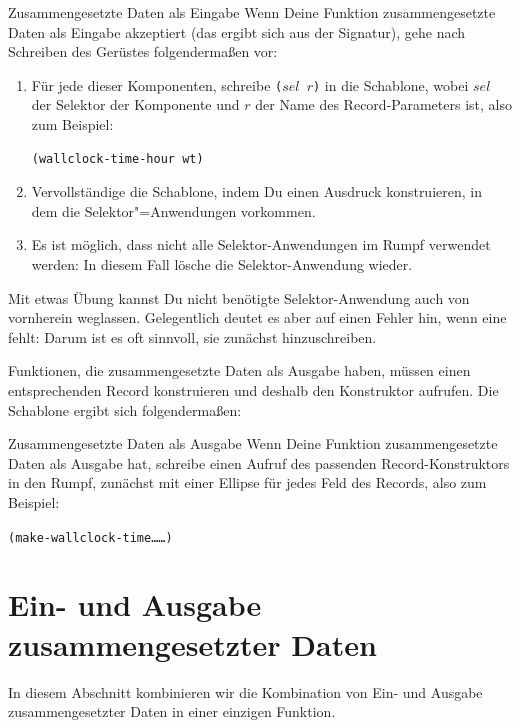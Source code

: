 \begin{konstruktionsanleitung}{Zusammengesetzte Daten als Eingabe}
  Wenn Deine Funktion zusammengesetzte Daten als Eingabe akzeptiert
  (das ergibt sich aus der Signatur), gehe nach Schreiben des Gerüstes
  folgendermaßen vor:
%
\begin{enumerate}
\item Für jede dieser Komponenten, schreibe  \texttt{($\mathit{sel}$ $r$)} in die
  Schablone, wobei $\mathit{sel}$ der Selektor der Komponente und $r$ der Name
  des Record-Parameters ist, also zum Beispiel:
\begin{verbatim}
(wallclock-time-hour wt)
\end{verbatim}
\item Vervollständige die Schablone, indem Du einen Ausdruck
  konstruieren, in dem die Selektor"=Anwendungen vorkommen.
\item Es ist möglich, dass nicht alle Selektor-Anwendungen im Rumpf
  verwendet werden: In diesem Fall lösche die Selektor-Anwendung
  wieder.
\end{enumerate}
%
\end{konstruktionsanleitung}
%
Mit etwas Übung kannst Du nicht benötigte Selektor-Anwendung auch von
vornherein weglassen.  Gelegentlich deutet es aber auf einen Fehler
hin, wenn eine fehlt: Darum ist es oft sinnvoll, sie zunächst
hinzuschreiben.

Funktionen, die zusammengesetzte Daten als Ausgabe haben, müssen einen
entsprechenden Record konstruieren und deshalb den Konstruktor
aufrufen.  Die Schablone ergibt sich folgendermaßen:
%
\begin{konstruktionsanleitung}{Zusammengesetzte Daten als Ausgabe}
  Wenn Deine Funktion zusammengesetzte Daten als Ausgabe hat, schreibe
  einen Aufruf des passenden Record-Konstruktors in den Rumpf,
  zunächst mit einer Ellipse für jedes Feld des Records, also zum
  Beispiel:
\begin{alltt}
(make-wallclock-time \ldots{} \ldots)
\end{alltt}

\end{konstruktionsanleitung}

\section{Ein- und Ausgabe zusammengesetzter Daten}
\label{sec:armadillo}

In diesem Abschnitt kombinieren wir die Kombination von Ein- und
Ausgabe zusammengesetzter Daten in einer einzigen Funktion.

